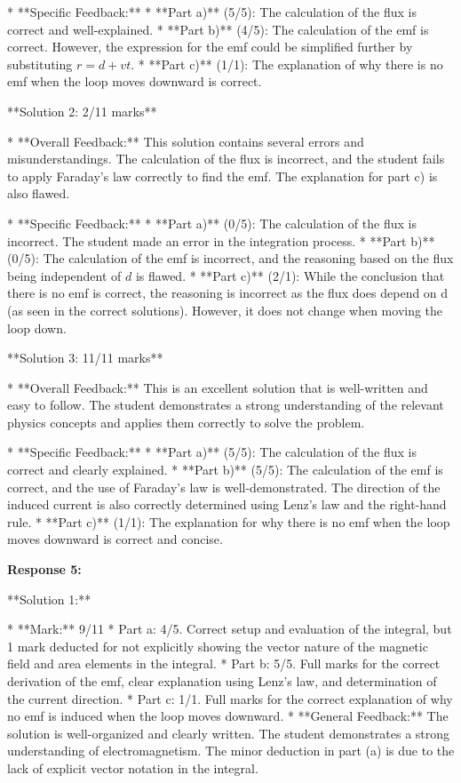 \documentclass[a4paper,11pt]{article}
\begin{document}
* **Specific Feedback:**
    * **Part a)** (5/5): The calculation of the flux is correct and well-explained.
    * **Part b)** (4/5): The calculation of the emf is correct. However, the expression for the emf could be simplified further by substituting  \(r = d + vt\).
    * **Part c)** (1/1): The explanation of why there is no emf when the loop moves downward is correct.

**Solution 2: 2/11 marks**

* **Overall Feedback:** This solution contains several errors and misunderstandings. The calculation of the flux is incorrect, and the student fails to apply Faraday's law correctly to find the emf. The explanation for part c) is also flawed.

* **Specific Feedback:**
    * **Part a)** (0/5): The calculation of the flux is incorrect. The student made an error in the integration process.
    * **Part b)** (0/5): The calculation of the emf is incorrect, and the reasoning based on the flux being independent of  \(d\) is flawed.
    * **Part c)** (2/1): While the conclusion that there is no emf is correct, the reasoning is incorrect as the flux does depend on d (as seen in the correct solutions). However, it does not change when moving the loop down.

**Solution 3: 11/11 marks**

* **Overall Feedback:** This is an excellent solution that is well-written and easy to follow. The student demonstrates a strong understanding of the relevant physics concepts and applies them correctly to solve the problem.

* **Specific Feedback:**
    * **Part a)** (5/5): The calculation of the flux is correct and clearly explained.
    * **Part b)** (5/5): The calculation of the emf is correct, and the use of Faraday's law is well-demonstrated. The direction of the induced current is also correctly determined using Lenz's law and the right-hand rule.
    * **Part c)** (1/1): The explanation for why there is no emf when the loop moves downward is correct and concise.

\textbf{Response 5:}

**Solution 1:**

* **Mark:** 9/11
    * Part a: 4/5. Correct setup and evaluation of the integral, but 1 mark deducted for not explicitly showing the vector nature of the magnetic field and area elements in the integral.
    * Part b: 5/5. Full marks for the correct derivation of the emf, clear explanation using Lenz's law, and determination of the current direction.
    * Part c: 1/1. Full marks for the correct explanation of why no emf is induced when the loop moves downward.
* **General Feedback:** The solution is well-organized and clearly written. The student demonstrates a strong understanding of electromagnetism. The minor deduction in part (a) is due to the lack of explicit vector notation in the integral.
\end{document}
